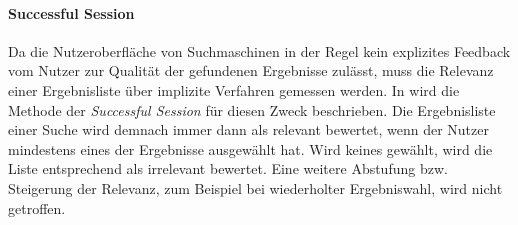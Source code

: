 \paragraph{Successful Session}\label{sec:successfulsession} Da die Nutzeroberfläche von Suchmaschinen in der Regel kein explizites Feedback vom Nutzer zur Qualität der gefundenen Ergebnisse  zulässt, muss die Relevanz einer Ergebnisliste über implizite Verfahren gemessen werden. In \citep{smyth05a} wird die Methode der \textit{Successful Session} für diesen Zweck beschrieben. Die Ergebnisliste einer Suche wird demnach immer dann als relevant bewertet, wenn der Nutzer mindestens eines der Ergebnisse ausgewählt hat. Wird keines gewählt, wird die Liste entsprechend als irrelevant bewertet. Eine weitere Abstufung bzw. Steigerung der Relevanz, zum Beispiel bei wiederholter Ergebniswahl, wird nicht getroffen. \citep{smyth05a} 
